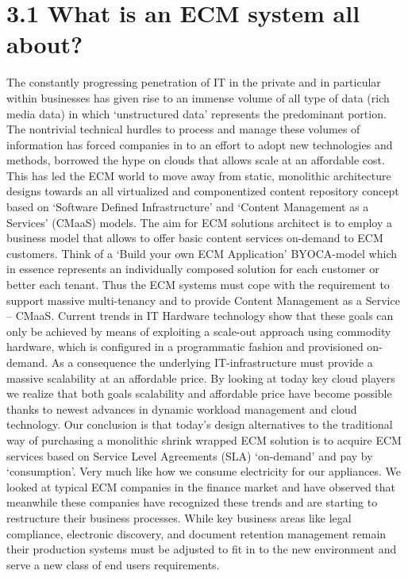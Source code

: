 \section{3.1 What is an ECM system all about?}
The constantly progressing penetration of IT in the private and in particular within businesses has given rise to an immense volume of all type of data (rich media data) in which ‘unstructured data’ represents the predominant portion.  The nontrivial technical hurdles to process and manage these volumes of information has forced companies in to an effort to adopt new technologies and methods, borrowed the hype on clouds that allows scale at an affordable cost. This has led the ECM world to move away from static, monolithic architecture designs towards an all virtualized and componentized content repository concept based on ‘Software Defined Infrastructure’ and ‘Content Management as a Services’ (CMaaS) models. The aim for ECM solutions architect is to employ a business model that allows to offer basic content services on-demand to ECM customers. Think of a ‘Build your own ECM Application’ BYOCA-model which in essence represents an individually composed solution for each customer or better each tenant. Thus the ECM systems must cope with the requirement to support massive multi-tenancy and to provide Content Management as a Service – CMaaS.   
Current trends in IT Hardware technology show that these goals can only be achieved by means of exploiting a scale-out approach using commodity hardware, which is configured in a programmatic fashion and provisioned on-demand. 
As a consequence the underlying IT-infrastructure must provide a massive scalability at an affordable price. By looking at today key cloud players we realize that both goals scalability and affordable price have become possible thanks to newest advances in dynamic workload management and cloud technology. 
 Our conclusion is that today’s design alternatives to the traditional way of purchasing a monolithic shrink wrapped ECM solution is to acquire ECM services based on Service Level Agreements (SLA) ‘on-demand’ and pay by ‘consumption’. Very much like how we consume electricity for our appliances.  
 We looked at typical ECM companies in the finance market and have observed that meanwhile these companies have recognized these trends and are starting to restructure their business processes. While key business areas like legal compliance, electronic discovery, and document retention management remain their production systems must be adjusted to fit in to the new environment and serve a new class of end users requirements.


